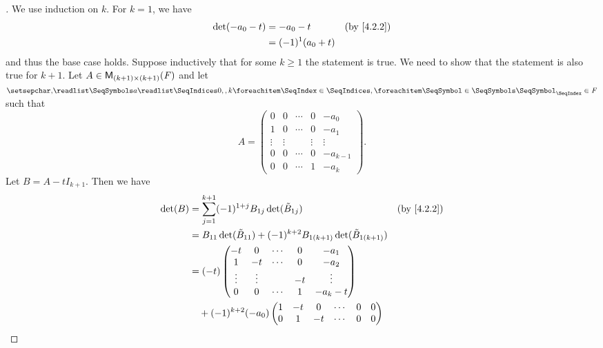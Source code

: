 \begin{proof}[]
	We use induction on \(k\).
	For \(k = 1\), we have
	\begin{align*}
		\det(-a_0 - t) & = -a_0 - t         &  & \by{4.2.2} \\
		               & = (-1)^1 (a_0 + t)
	\end{align*}
	and thus the base case holds.
	Suppose inductively that for some \(k \geq 1\) the statement is true.
	We need to show that the statement is also true for \(k + 1\).
	Let \(A \in \mathsf{M}_{{(k + 1)} \times (k + 1)}({\mathit{F}})\) and let \(\seq{a}{0,,k} \in \F\) such that
	\[
		A = \begin{pmatrix}
			0      & 0      & \cdots & 0      & -a_0       \\
			1      & 0      & \cdots & 0      & -a_1       \\
			\vdots & \vdots &        & \vdots & \vdots     \\
			0      & 0      & \cdots & 0      & -a_{k - 1} \\
			0      & 0      & \cdots & 1      & -a_k
		\end{pmatrix}.
	\]
	Let \(B = A - t I_{k + 1}\).
	Then we have
	\begin{align*}
		\det(B) & = \sum_{j = 1}^{k + 1} (-1)^{1 + j} B_{1 j} \det(\tilde{B}_{1 j})                        &  & \by{4.2.2}                       \\
		        & = B_{1 1} \det(\tilde{B}_{1 1}) + (-1)^{k + 2} B_{1 (k + 1)} \det(\tilde{B}_{1 (k + 1)})                                       \\
		        & = (-t) \begin{pmatrix}
			                 -t     & 0      & \cdots & 0  & -a_1     \\
			                 1      & -t     & \cdots & 0  & -a_2     \\
			                 \vdots & \vdots &        & -t & \vdots   \\
			                 0      & 0      & \cdots & 1  & -a_k - t
		                 \end{pmatrix}                                                                                \\
		        & \quad + (-1)^{k + 2} (-a_0) \begin{pmatrix}
			                                      1      & -t     & 0      & \cdots & 0      & 0      \\
			                                      0      & 1      & -t     & \cdots & 0      & 0      \\

\end{pmatrix}
\end{align*}
\end{proof}
